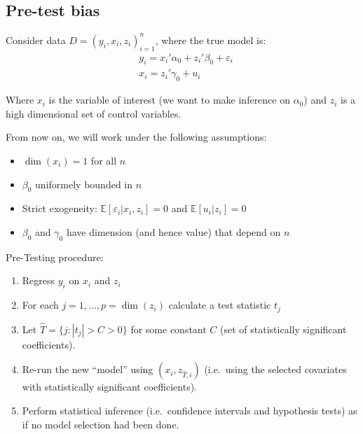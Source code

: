 \documentclass[12pt,]{book}
\providecommand{\tightlist}{%
  \setlength{\itemsep}{0pt}\setlength{\parskip}{0pt}}
\begin{document}
\hypertarget{pre-test-bias}{%
\subsection{Pre-test bias}\label{pre-test-bias}}

Consider data \(D= (y_i, x_i, z_i)_{i=1}^n\), where the true model is:
\[
\begin{aligned}
& y_i = x_i' \alpha_0  + z_i' \beta_0 + \varepsilon_i \\
& x_i = z_i' \gamma_0 + u_i
\end{aligned}
\]

Where \(x_i\) is the variable of interest (we want to make inference on \(\alpha_0\)) and \(z_i\) is a high dimensional set of control variables.

From now on, we will work under the following assumptions:

\begin{itemize}
\tightlist
\item
  \(\dim(x_i)=1\) for all \(n\)
\item
  \(\beta_0\) uniformely bounded in \(n\)
\item
  Strict exogeneity: \(\mathbb E[\varepsilon_i | x_i, z_i] = 0\) and \(\mathbb E[u_i | z_i] = 0\)
\item
  \(\beta_0\) and \(\gamma_0\) have dimension (and hence value) that depend on \(n\)
\end{itemize}

Pre-Testing procedure:

\begin{enumerate}
\def\labelenumi{\arabic{enumi}.}
\tightlist
\item
  Regress \(y_i\) on \(x_i\) and \(z_i\)
\item
  For each \(j = 1, ..., p = \dim(z_i)\) calculate a test statistic \(t_j\)
\item
  Let \(\hat{T} = \{ j: |t_j| > C > 0 \}\) for some constant \(C\) (set of statistically significant coefficients).
\item
  Re-run the new ``model'' using \((x_i, z_{\hat{T},i})\) (i.e.~using the selected covariates with statistically significant coefficients).
\item
  Perform statistical inference (i.e.~confidence intervals and hypothesis tests) as if no model selection had been done.
\end{enumerate}
\end{document}
